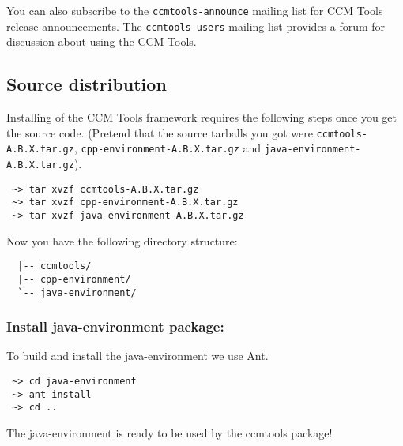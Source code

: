 You can also subscribe to the {\tt ccmtools-announce} mailing list for CCM Tools
release announcements. The {\tt ccmtools-users} mailing list provides a forum
for discussion about using the CCM Tools.



\subsection{Source distribution}
Installing of the CCM Tools framework requires the following steps once you get 
the source code. 
(Pretend that the source tarballs you got were {\tt ccmtools-A.B.X.tar.gz},
{\tt cpp-environment-A.B.X.tar.gz} and {\tt java-environment-A.B.X.tar.gz}).

\begin{small}
\begin{verbatim}
 ~> tar xvzf ccmtools-A.B.X.tar.gz
 ~> tar xvzf cpp-environment-A.B.X.tar.gz
 ~> tar xvzf java-environment-A.B.X.tar.gz
\end{verbatim}
\end{small}

Now you have the following directory structure: 
\begin{small}
\begin{verbatim}
  |-- ccmtools/
  |-- cpp-environment/
  `-- java-environment/

\end{verbatim}
\end{small}


\subsubsection{Install java-environment package:}
To build and install the java-environment we use Ant. 
\begin{small}
\begin{verbatim}
 ~> cd java-environment
 ~> ant install 
 ~> cd ..
\end{verbatim}
\end{small}
The java-environment is ready to be used by the ccmtools package!

